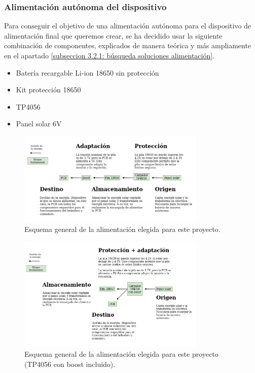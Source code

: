 \documentclass[12pt]{article}
\begin{document}
	\subsubsection{Alimentación autónoma del dispositivo}
	
	\noindent Para conseguir el objetivo de una alimentación autónoma para el dispositivo de alimentación final que queremos crear, se ha decidido usar la siguiente combinación de componentes, explicados de manera teórica y más ampliamente en el apartado \ref{subseccion 3.2.1: búsqueda soluciones alimentación}. \\
	
	\begin{itemize}
		\item Batería recargable Li-ion 18650 sin protección
		\item Kit protección 18650
		\item TP4056
		\item Panel solar 6V
	\end{itemize}
	
	\begin{figure}[h!]
		\begin{center}
			\includegraphics[width=0.8\textwidth]{img/conexiones tfg-alimentacion.png}
			\caption{Esquema general de la alimentación elegida para este proyecto.}
			\label{Alimentación: esquema general}
		\end{center}
	\end{figure}

	\begin{figure}[h!]
		\begin{center}
			\includegraphics[width=0.8\textwidth]{img/conexiones tfg-alimentacion (boost en tp).png}
			\caption{Esquema general de la alimentación elegida para este proyecto (TP4056 con boost incluido).}
			\label{Alimentación: esquema general (tp con boost)}
		\end{center}
	\end{figure}
	
\end{document}
